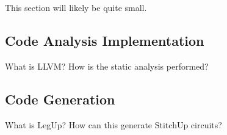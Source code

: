 

This section will likely be quite small.

\subsection{Code Analysis Implementation}
What is LLVM? How is the static analysis performed?

\subsection{Code Generation}
What is LegUp? How can this generate StitchUp circuits?
